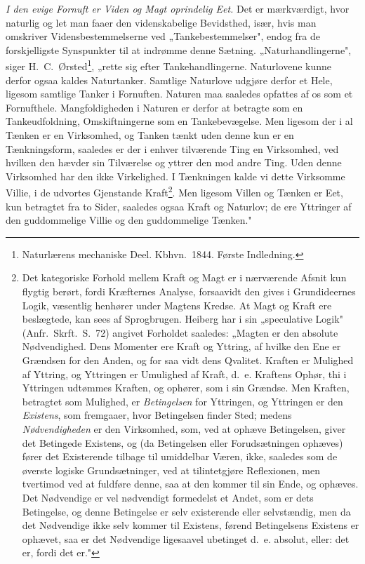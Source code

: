 \documentclass[12pt]{book}
\newcommand{\opage}[1]{\marginnote{\footnotesize\textit{[#1]}}}
\begin{document}
\emph{I den evige Fornuft er Viden og Magt oprindelig Eet.} Det er mærkværdigt, hvor naturlig og
let man faaer den videnskabelige Bevidsthed, især, hvis man omskriver
\opage{209} Vidensbestemmelserne ved „Tankebestemmelser", endog fra de forskjelligste Synspunkter til at
indrømme denne Sætning. „Naturhandlingerne", siger H.\ C.\ Ørsted\footnote{Naturlærens mechaniske
Deel. Kbhvn.\ 1844. Første Indledning.}, „rette sig efter Tankehandlingerne. Naturlovene kunne
derfor ogsaa kaldes Naturtanker. Samtlige Naturlove udgjøre derfor et Hele, ligesom samtlige Tanker
i Fornuften. Naturen maa saaledes opfattes af os som et Fornufthele. Mangfoldigheden i Naturen er
derfor at betragte som en Tankeudfoldning, Omskiftningerne som en Tankebevægelse. Men ligesom der i
al Tænken er en Virksomhed, og Tanken tænkt uden denne kun er en Tænkningsform, saaledes er der i
enhver tilværende Ting en Virksomhed, ved hvilken den hævder sin Tilværelse og yttrer den mod andre
Ting. Uden denne Virksomhed har den ikke Virkelighed. I Tænkningen kalde vi dette Virksomme Villie,
i de udvortes Gjenstande Kraft\footnote{Det kategoriske Forhold mellem Kraft og Magt er i nærværende
Afsnit kun flygtig berørt, fordi Kræfternes Analyse, forsaavidt den gives i Grundideernes Logik,
væsentlig henhører under Magtens Kredse. At Magt og Kraft ere beslægtede, kan sees af Sprogbrugen.
Heiberg har i sin „speculative Logik" (Anfr.\ Skrft.\ S.~72) angivet Forholdet saaledes: „Magten er
den absolute Nødvendighed. Dens Momenter ere Kraft og Yttring, af hvilke den Ene er Grændsen for den
Anden, og for saa vidt dens Qvalitet. Kraften er Mulighed af Yttring, og Yttringen er Umulighed af
Kraft, d.\ e. Kraftens Ophør, thi i Yttringen udtømmes Kraften, og ophører, som i sin Grændse. Men
Kraften, betragtet som Mulighed, er \emph{Betingelsen} for Yttringen, og Yttringen er den
\emph{Existens}, som fremgaaer, hvor Betingelsen finder Sted; medens \emph{Nødvendigheden} er den
Virksomhed, som, ved at ophæve Betingelsen, giver det Betingede Existens, og (da Betingelsen eller
Forudsætningen ophæves) fører det Existerende tilbage til umiddelbar Væren, ikke, saaledes som de
øverste logiske Grundsætninger, ved at tilintetgjøre Reflexionen, men tvertimod ved at fuldføre
denne, saa at den kommer til sin Ende, og ophæves. Det Nødvendige er vel nødvendigt formedelst et
Andet, som er dets Betingelse, og denne Betingelse er selv existerende eller selvstændig, men da det
Nødvendige ikke selv kommer til Existens, førend Betingelsens Existens er ophævet, saa er det
Nødvendige ligesaavel ubetinget d.\ e. absolut, eller: det er, fordi det er."}. Men ligesom Villen
og Tænken
\opage{210} er Eet, kun betragtet fra to Sider, saaledes ogsaa Kraft og Naturlov; de ere Yttringer af den
guddommelige Villie og den guddommelige Tænken."
\end{document}
